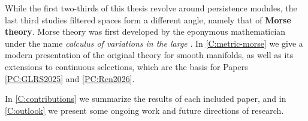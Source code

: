 While the first two-thirds of this thesis revolve around persistence modules, the last third studies filtered spaces form a different angle, namely that of \textbf{Morse theory}. Morse theory was first developed by the eponymous mathematician under the name \textit{calculus of variations in the large} \cite{Morse1934}. In \cref{C:metric-morse} we give a modern presentation of the original theory for smooth manifolds, as well as its extensions to continuous selections, which are the basis for Papers \ref{PC:GLRS2025} and \ref{PC:Ren2026}.

In \cref{C:contributions} we summarize the results of each included paper, and in \cref{C:outlook} we present some ongoing work and future directions of research.